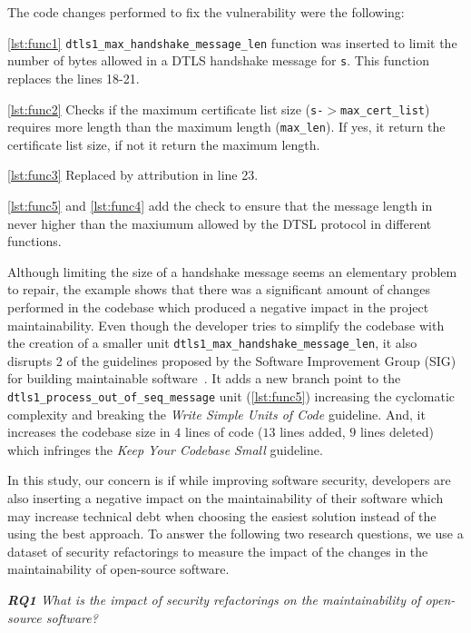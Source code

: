 \documentclass[10pt,conference]{IEEEtran}
\begin{document}
The code changes performed to fix the vulnerability were the following:

\ref{lst:func1} \texttt{dtls1\_max\_handshake\_message\_len} function was inserted to limit the number of bytes allowed in a DTLS handshake message for \texttt{s}. This function replaces the lines 18-21.

\ref{lst:func2} Checks if the maximum certificate list size (\texttt{s-$>$max\_cert\_list}) requires more length than the maximum length (\texttt{max\_len}). If yes, it return the certificate list size, if not it return the maximum length.

\ref{lst:func3} Replaced by attribution in line 23.

\ref{lst:func5} and \ref{lst:func4} add the check to ensure that the message length in never higher than the maxiumum allowed by the DTSL protocol in different functions.

Although limiting the size of a handshake message seems an elementary problem to repair, the example shows that there was a significant amount of changes performed in the codebase which produced a negative impact in the project maintainability. Even though the developer tries to simplify the codebase with the creation of a smaller unit \texttt{dtls1\_max\_handshake\_message\_len}, it also disrupts 2 of the guidelines proposed by the Software Improvement Group (SIG) for building maintainable software~\cite{Visser:2016:OREILLY}. It adds a new branch point to the \texttt{dtls1\_process\_out\_of\_seq\_message} unit (\ref{lst:func5}) increasing the cyclomatic complexity and breaking the \emph{Write Simple Units of Code} guideline. And, it increases the codebase size in $4$ lines of code ($13$ lines added, $9$ lines deleted) which infringes the \emph{Keep Your Codebase Small} guideline.

In this study, our concern is if while improving software security, developers are also inserting a negative impact on the maintainability of their software which may increase technical debt when choosing the easiest solution instead of the using the best approach. To answer the following two research questions, we use a dataset of security refactorings to measure the impact of the changes in the maintainability of open-source software.


\begin{framed}
\textit{\textbf{RQ1} What is the impact of security refactorings on the maintainability of open-source software?}
\end{framed}
\end{document}
